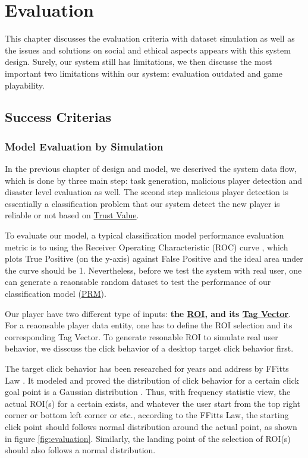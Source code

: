 \section{Evaluation}
\label{chapter:evaluation}

This chapter discusses the evaluation criteria with dataset simulation as well as 
the issues and solutions on social and ethical aspects appears with this system design.
Surely, our system still has limitations, 
we then discusse the most important two limitations within our system: 
evaluation outdated and game playability.

\subsection{Success Criterias}

\subsubsection{Model Evaluation by Simulation}

In the previous chapter of design and model, we descrived the system data flow, which is
done by three main step: task generation, malicious player detection and disaster level evaluation as well.
The second step malicious player detection is essentially a classification problem that 
our system detect the new player is reliable or not based on \hyperref[def:tv]{Trust Value}.

To evaluate our model, a typical classification model performance evaluation metric is to 
using the Receiver Operating Characteristic (ROC) curve \cite{hanley1982meaning}, which 
plots True Positive (on the y-axis) against False Positive and the ideal area under the curve
should be 1.
Nevertheless, before we test the system with real user, one can generate a reaonsable random dataset 
to test the performance of our classification model (\hyperref[idx:prm]{PRM}).

Our player have two different type of inputs: \textbf{the \hyperref[def:roi]{ROI}, 
and its \hyperref[def:tagv]{Tag Vector}}. For a reaonsable player data entity, 
one has to define the ROI selection and its corresponding Tag Vector.
To generate resonable ROI to simulate real user behavior, we disscuss the click behavior
of a desktop target click behavior first.

The target click behavior has been researched for years and address by FFitts Law \cite{bi2013ffitts}.
It modeled and proved the distribution of click behavior for a certain click goal point is a Gaussian distribution \cite{goodman1963statistical}.
Thus, with frequency statistic view, the actual ROI(s) for a certain exists, 
and whatever the user start from the top right corner or bottom left corner or etc., 
according to the FFitts Law, the starting click point should follows normal distribution around the actual point,
as shown in figure \ref{fig:evaluation}. Similarly, the landing point of the selection of ROI(s)
should also follows a normal distribution. 


